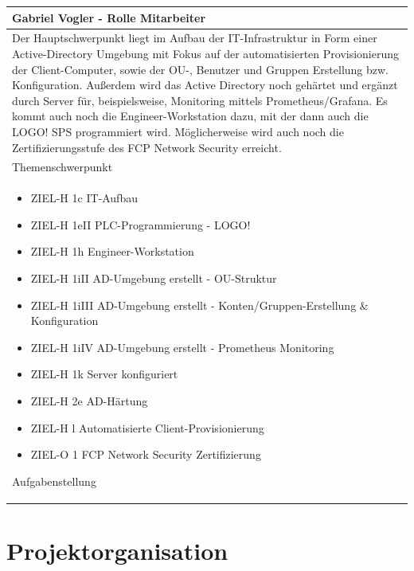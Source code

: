 \documentclass[
	headings=optiontotocandhead,%
	oneside,
	numbers=noenddot,%
	toc=flat, %
	10pt, %
	parskip=full, %
	listof=totoc, %
	listof=flat, %
	numbers=noenddot, %
	bibliography=totoc, %
	a4paper,DIV=14,
]{scrartcl}
\begin{document}
\begin{table}[H]
	\begin{tabularx} {\textwidth} {
			|>{\hsize=1\hsize}X|
		}
		
		\hline
		\rowcolor[HTML]{D9D9D9} 
		\rule{0pt}{15pt}
		\textbf{\normalsize{Gabriel Vogler - Rolle Mitarbeiter}} \\ \hline
		
		\rule{0pt}{20pt}Der Hauptschwerpunkt liegt im Aufbau der IT-Infrastruktur in Form einer Active-Directory Umgebung mit Fokus auf der automatisierten Provisionierung der Client-Computer, sowie der OU-, Benutzer und Gruppen Erstellung bzw. Konfiguration. Außerdem wird das Active Directory noch gehärtet und ergänzt durch Server für, beispielsweise, Monitoring mittels Prometheus/Grafana. Es kommt auch noch die Engineer-Workstation dazu, mit der dann auch die LOGO! SPS programmiert wird. Möglicherweise wird auch noch die Zertifizierungsstufe des FCP Network Security erreicht.\\
		\rule{0pt}{11pt}\textcolor[HTML]{A6A6A6}{\footnotesize{Themenschwerpunkt}} \\ \hline
		
		\begin{itemize}[itemsep=0pt, parsep=0pt, topsep=0pt]
			\item{ZIEL-H 1c IT-Aufbau}
			\item{ZIEL-H 1eII PLC-Programmierung - LOGO!}
			\item{ZIEL-H 1h Engineer-Workstation}
			\item{ZIEL-H 1iII AD-Umgebung erstellt - OU-Struktur}
			\item{ZIEL-H 1iIII AD-Umgebung erstellt - Konten/Gruppen-Erstellung \& Konfiguration}
			\item{ZIEL-H 1iIV AD-Umgebung erstellt - Prometheus Monitoring}
			\item{ZIEL-H 1k Server konfiguriert}
			\item{ZIEL-H 2e AD-Härtung}
			\item{ZIEL-H l Automatisierte Client-Provisionierung}
			\item{ZIEL-O 1 FCP Network Security Zertifizierung}
		\end{itemize}
		
		\rule{0pt}{11pt}\textcolor[HTML]{A6A6A6}{\footnotesize{Aufgabenstellung}} \\ \hline
	\end{tabularx}
\end{table}

\newpage
\section{Projektorganisation}
\end{document}
